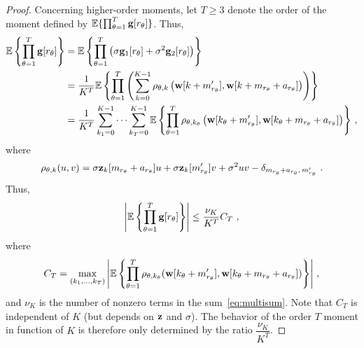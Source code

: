 \documentclass[journal,onecolumn]{IEEEtran}
\begin{document}
\begin{proof}
Concerning higher-order moments, let $T\geq 3$ denote the order of the moment defined by ${\mathbb E}\{\prod_{\theta=1}^T{\mathbf g}[r_\theta]\}$. Thus,
\begin{align}
\nonumber
\EE\left\{\prod_{\theta=1}^T\bg[r_\theta]\right\}& = \EE\left\{\prod_{\theta=1}^T \left(\sigma\bg_1[r_\theta] + \sigma^2\bg_2[r_\theta] \right)\right\}\\
\nonumber
&=\dfrac1{K^T}\EE\left\{\prod_{\theta=1}^T \left(\sum_{k=0}^{K-1}\rho_{\theta,k}\left(\bw[k+m'_{r_\theta}],\bw[k+m_{r_\theta}+a_{r_\theta}]\right) \right)\right\}\\ 
&=\dfrac1{K^T}\sum_{k_1=0}^{K-1}\cdots\sum_{k_T=0}^{K-1}\EE\left\{\prod_{\theta=1}^T \rho_{\theta,k_\theta}\left(\bw[k_\theta+m'_{r_\theta}],\bw[k_\theta+m_{r_\theta}+a_{r_\theta}]\right) \right\} \,,
\label{eq:multisum}
\end{align}
where
\[
\rho_{\theta,k}(u,v)=\sigma \bz_k[m_{r_\theta}+a_{r_\theta}]u + \sigma \bz_k[m'_{r_\theta}]v + \sigma^2uv - \delta_{m_{r_\theta}+a_{r_\theta},\,m'_{r_\theta}}\ .
\]
Thus,
\begin{equation*}
\left|{\mathbb E}\left\{\prod_{\theta=1}^T{\mathbf g}[r_\theta]\right\}\right| \leq \dfrac{\nu_K}{K^T} C_T\ ,
\end{equation*}
where
\[
C_T = \max_{(k_1,\ldots,k_T)} \left|{\mathbb E}\left\{\prod_{\theta=1}^T \rho_{\theta,k_\theta}({\mathbf w}[k_\theta+m'_{r_\theta}],{\mathbf w}[k_\theta+m_{r_\theta}+a_{r_\theta}]) \right\} \right| \,,
\]
and $\nu_K$ is the number of nonzero terms in the sum~\eqref{eq:multisum}. Note that $C_T$ is independent of $K$ (but depends on ${\mathbf z}$ and $\sigma$). The behavior of the order $T$ moment in function of $K$ is therefore only determined by the ratio $\dfrac{\nu_K}{K^T}$.


\end{proof}
\end{document}
